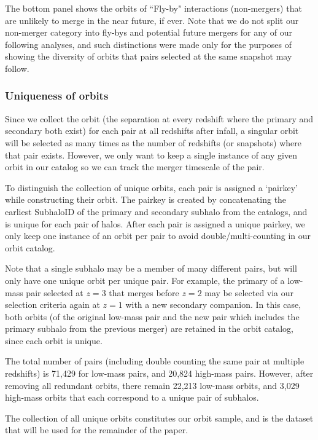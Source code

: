 \documentclass[twocolumn,linenumbers]{aastex631}
\begin{document}
The bottom panel shows the orbits of ``Fly-by" interactions (non-mergers) that are unlikely to merge in the near future, if ever.  
Note that we do not split our non-merger category into fly-bys and potential future mergers for any of our following analyses, and such distinctions were made only for the purposes of showing the diversity of orbits that pairs selected at the same snapshot may follow.


\subsubsection{Uniqueness of orbits}
\label{sec:methods-unique}
Since we collect the orbit (the separation at every redshift where the primary and secondary both exist) for each pair at all redshifts after infall, a singular orbit will be selected as many times as the number of redshifts (or snapshots) where that pair exists. However, we only want to keep a single instance of any given orbit in our catalog so we can track the merger timescale of the pair.

To distinguish the collection of unique orbits, each pair is assigned a `pairkey' while constructing their orbit. 
The pairkey is created by concatenating the earliest SubhaloID of the primary and secondary subhalo from the \sublink{} catalogs, and is unique for each pair of halos. 
After each pair is assigned a unique pairkey, we only keep one instance of an orbit per pair to avoid double/multi-counting in our orbit catalog.

Note that a single subhalo may be a member of many different pairs, but will only have one unique orbit per unique pair.
For example, the primary of a low-mass pair selected at $z=3$ that merges before $z=2$ may be selected via our selection criteria again at $z=1$ with a new secondary companion. 
In this case, both orbits (of the original low-mass pair and the new pair which includes the primary subhalo from the previous merger) are retained in the orbit catalog, since each orbit is unique.

The total number of pairs (including double counting the same pair at multiple redshifts) is 71,429 for low-mass pairs, and 20,824 high-mass pairs. 
However, after removing all redundant orbits, there remain 22,213 low-mass orbits, and 3,029 high-mass orbits that each correspond to a unique pair of subhalos.

The collection of all unique orbits constitutes our orbit sample, and is the dataset that will be used for the remainder of the paper.
\end{document}
